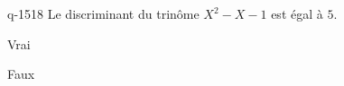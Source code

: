 \begin{truefalse}{q-1518}
Le discriminant du trinôme $X^2-X-1$ est égal à $5$.
\item* Vrai
\item Faux
\end{truefalse}


